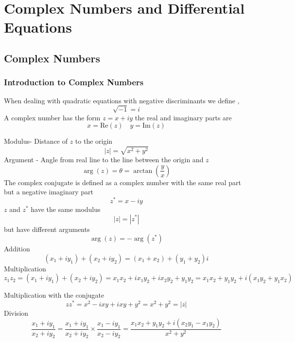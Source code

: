 \documentclass[11pt,titlepage]{article}
\numberwithin{equation}{section}
\begin{document}
\section{Complex Numbers and Differential Equations}
\subsection{Complex Numbers}
\subsubsection{Introduction to Complex Numbers}
When dealing with quadratic equations with negative discriminants we define ,
\begin{equation}
    \sqrt{ -1 }=i
\end{equation}
A complex number has the form $z=x+iy$ the real and imaginary parts are
\begin{equation}
    x=\mathrm{Re}(z) \quad y=\mathrm{Im}(z)
\end{equation}

Modulus- Distance of $z$ to the origin
\begin{equation}
    |z|=\sqrt{ x^2+y^2 }
\end{equation}
Argument - Angle from real line to the line between the origin and $z$
\begin{equation}
    \arg(z)=\theta=\arctan\left( \frac{y}{x} \right)
\end{equation}
The complex conjugate is defined as a complex number with the same real part but a negative imaginary part
\begin{equation}
    z^{*}=x-iy
\end{equation}
$z$ and $z^{*}$ have the same modulus
\begin{equation}
    |z|=|z^{*}|
\end{equation}
but have different arguments 
\begin{equation}
    \arg(z)=-\arg(z^{*})
\end{equation}
Addition
\begin{equation}
    (x_{1}+iy_{1})+(x_{2}+iy_{2})=(x_{1}+x_{2})+(y_{1}+y_{2})i
\end{equation}
Multiplication
\begin{equation}
    z_{1}z_{2}=(x_{1}+iy_{1})+(x_{2}+iy_{2})=x_{1}x_{2}+ix_{1}y_{2}+ix_{2}y_{2}+y_{1}y_{2}=x_{1}x_{2}+y_{1}y_{2}+i(x_{1}y_{2}+y_{1}x_{2})
\end{equation}


Multiplication with the conjugate
\begin{equation}
zz^{*}=x^2-ixy+ixy+y^2=x^2+y^2=|z|
\end{equation}
Division
\begin{equation}
    \frac{x_{1}+iy_{1}}{x_{2}+iy_{2}}=\frac{x_{1}+iy_{1}}{x_{2}+iy_{2}}\times\frac{x_{1}-iy_{1}}{x_{2}-iy_{2}}=\frac{x_{1}x_{2}+y_{1}y_{2}+i(x_{2}y_{1}-x_{1}y_{2})}{x^2+y^2}
\end{equation}
\end{document}
